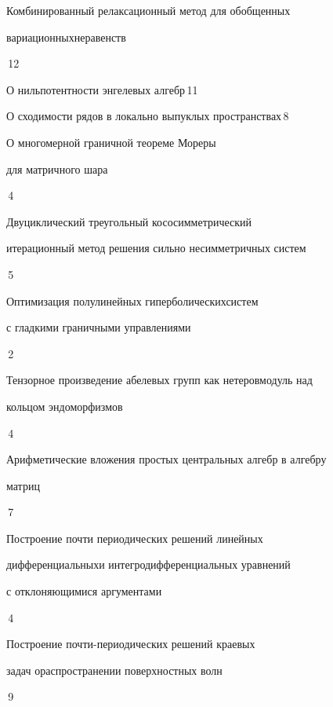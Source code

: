 

{Комбинированный релаксационный метод для обобщенных


вариационных\newline неравенств}{\No\,12}




{О нильпотентности энгелевых алгебр}{\No\,11}




{О сходимости рядов в локально выпуклых пространствах}{\No\,8}




{О многомерной граничной теореме Мореры


для матричного шара}{\No\,4}




{Двуциклический треугольный кососимметрический \newline


итерационный метод решения сильно несимметричных систем}{\No\,5}




{Оптимизация полулинейных гиперболических\newline систем 


с гладкими граничными управлениями}{\No\,2}




{Тензорное произведение абелевых групп как нетеров\newline модуль над 


кольцом эндоморфизмов}{\No\,4}




{Арифметические вложения простых центральных алгебр в алгебру\newline 


матриц}{\No\,7}




{Построение почти периодических решений линейных 


дифференциальных\newline и интегродифференциальных уравнений 


с отклоняющимися аргументами}{\No\,4}




{Построение почти-периодических решений краевых  


задач о\newline распространении поверхностных волн}{\No\,9}


